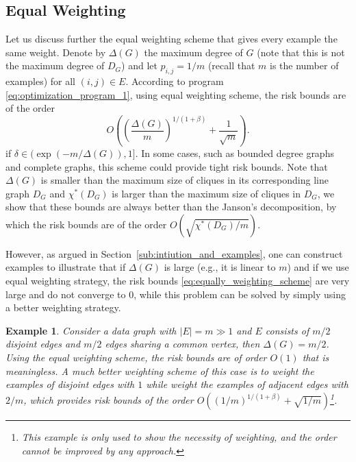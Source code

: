 \documentclass[letterpaper]{article} %
\newtheorem{example}{Example}
\newcommand{\pair}[1]{(#1)}
\newcommand{\fcoloring}{\chi^*}
\newcommand{\complexbound}{\beta}
\begin{document}
\subsection{Equal Weighting} %
\label{sub:equally_weighting}
Let us discuss further the equal weighting scheme that gives every example the same weight. Denote by $\Delta(G)$ the maximum degree of $G$ (note that this is not the maximum degree of $D_G$) and let $p_{i,j}=1/m$ (recall that $m$ is the number of examples) for all $\pair{i,j}\in E$. According to program \eqref{eq:optimization_program_1}, using equal weighting scheme, the risk bounds are of the order 
\begin{equation}
\label{eq:equally_weighting_scheme}
    O((\frac{\Delta(G)}{m})^{1/(1+\complexbound{})} + \frac{1}{\sqrt{m}}).
\end{equation}
if $\delta\in (\exp(-m/\Delta(G)),1]$. In some cases, such as bounded degree graphs and complete graphs, this scheme could provide tight risk bounds.
Note that $\Delta(G)$ is smaller than the maximum size of cliques in its corresponding line graph $D_G$ and $\fcoloring{}(D_G)$ is larger than the maximum size of cliques in $D_G$, we show that these bounds are always better than the Janson's decomposition, by which the risk bounds are of the order $O(\sqrt{\fcoloring{}(D_G)/m})$.

However, as argued in Section~\ref{sub:intiution_and_examples}, one can construct examples to illustrate that if $\Delta(G)$ is large (e.g., it is linear to $m$) and if we use equal weighting strategy, the risk bounds \eqref{eq:equally_weighting_scheme} are very large and do not converge to $0$, while this problem can be solved by simply using a better weighting strategy. 
\begin{example}
Consider a data graph with $|E|=m \gg 1$ and $E$ consists of $m/2$ disjoint edges and $m/2$ edges sharing a common vertex, then $\Delta(G)=m/2$. Using the equal weighting scheme, the risk bounds are of order $O(1)$ that is meaningless. A much better weighting scheme of this case is to weight the examples of disjoint edges with $1$ while weight the examples of adjacent edges with $2/m$, which provides risk bounds of the order $O\left((1/m)^{1/(1+\complexbound{})} + \sqrt{1/m}\right)$\footnote{This example is only used to show the necessity of weighting, and the order cannot be improved by any approach.}.
\end{example}
\end{document}

